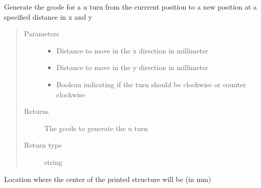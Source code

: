 \documentclass[letterpaper,10pt,english]{sphinxmanual}
\begin{document}
\begin{fulllineitems}
\begin{fulllineitems}
\label{\detokenize{index:generator.generator.u_turn}}
\sphinxAtStartPar
Generate the gcode for a u turn from the currrent position to a new position at a specified distance in x and y
\begin{quote}\begin{description}
\item[{Parameters}] \leavevmode\begin{itemize}
\item {} 
\sphinxAtStartPar
{} \textendash{} Distance to move in the x direction in millimeter

\item {} 
\sphinxAtStartPar
{} \textendash{} Distance to move in the y direction in millimeter

\item {} 
\sphinxAtStartPar
{} \textendash{} Boolean indicating if the turn should be clockwise or counter clockwise

\end{itemize}

\item[{Returns}] \leavevmode
\sphinxAtStartPar
The gcode to generate the u turn

\item[{Return type}] \leavevmode
\sphinxAtStartPar
string

\end{description}\end{quote}

\end{fulllineitems}


\begin{fulllineitems}
\label{\detokenize{index:generator.generator.x_center}}
\sphinxAtStartPar
Location where the center of the printed structure will be (in mm)

\end{fulllineitems}


\end{fulllineitems}
\end{document}
